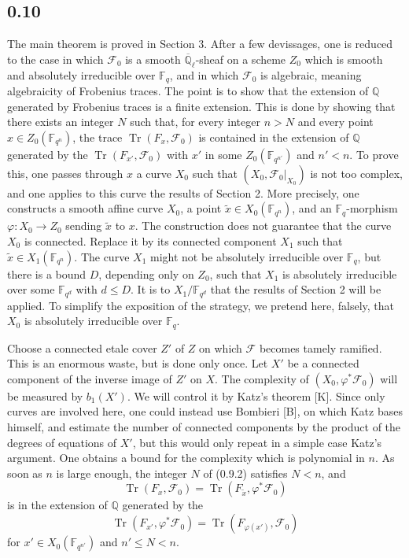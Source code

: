 \documentclass[11pt]{article}
\newcommand{\F}{\mathbb{F}}
\newcommand{\Q}{\mathbb{Q}}
\newcommand{\Ql}{\overline{\mathbb Q}_{\ell}}
\newcommand{\Tr}{\operatorname{Tr}}
\begin{document}
\subsection*{0.10}
The main theorem is proved in Section 3.
After a few devissages, one is reduced to the case in which $\mathcal F_0$ is a smooth $\Ql$-sheaf on a scheme $Z_0$ which is smooth and absolutely irreducible over $\F_q$, and in which $\mathcal F_0$ is algebraic, meaning algebraicity of Frobenius traces.
The point is to show that the extension of $\Q$ generated by Frobenius traces is a finite extension.
This is done by showing that there exists an integer $N$ such that, for every integer $n>N$ and every point $x\in Z_0(\F_{q^n})$, the trace $\Tr(F_x,\mathcal F_0)$ is contained in the extension of $\Q$ generated by the $\Tr(F_{x'},\mathcal F_0)$ with $x'$ in some $Z_0(\F_{q^{n'}})$ and $n'<n$.
To prove this, one passes through $x$ a curve $X_0$ such that $(X_0,\mathcal F_0|_{X_0})$ is not too complex, and one applies to this curve the results of Section 2.
More precisely, one constructs a smooth affine curve $X_0$, a point $\widetilde x\in X_0(\F_{q^n})$, and an $\F_q$-morphism $\varphi:X_0\to Z_0$ sending $\widetilde x$ to $x$.
The construction does not guarantee that the curve $X_0$ is connected.
Replace it by its connected component $X_1$ such that $\widetilde x\in X_1(\F_{q^n})$.
The curve $X_1$ might not be absolutely irreducible over $\F_q$, but there is a bound $D$, depending only on $Z_0$, such that $X_1$ is absolutely irreducible over some $\F_{q^d}$ with $d\le D$.
It is to $X_1/\F_{q^d}$ that the results of Section 2 will be applied.
To simplify the exposition of the strategy, we pretend here, falsely, that $X_0$ is absolutely irreducible over $\F_q$.

Choose a connected etale cover $Z'$ of $Z$ on which $\mathcal F$ becomes tamely ramified.
This is an enormous waste, but is done only once.
Let $X'$ be a connected component of the inverse image of $Z'$ on $X$.
The complexity of $(X_0,\varphi^*\mathcal F_0)$ will be measured by $b_1(X')$.
We will control it by Katz's theorem [K].
Since only curves are involved here, one could instead use Bombieri [B], on which Katz bases himself, and estimate the number of connected components by the product of the degrees of equations of $X'$, but this would only repeat in a simple case Katz's argument.
One obtains a bound for the complexity which is polynomial in $n$.
As soon as $n$ is large enough, the integer $N$ of (0.9.2) satisfies $N<n$, and
\[
 \Tr(F_x,\mathcal F_0)=\Tr(F_{\widetilde x},\varphi^*\mathcal F_0)
\]
is in the extension of $\Q$ generated by the
\[
 \Tr(F_{x'},\varphi^*\mathcal F_0)=\Tr(F_{\varphi(x')},\mathcal F_0)
\]
for $x'\in X_0(\F_{q^{n'}})$ and $n'\le N<n$.
\end{document}
